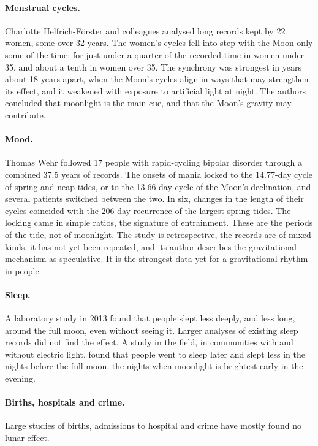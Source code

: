 \documentclass[11pt,a4paper]{article}
\begin{document}
\paragraph{Menstrual cycles.} Charlotte Helfrich-F\"orster and colleagues analysed long records kept by 22 women, some over 32 years. The women's cycles fell into step with the Moon only some of the time: for just under a quarter of the recorded time in women under 35, and about a tenth in women over 35. The synchrony was strongest in years about 18 years apart, when the Moon's cycles align in ways that may strengthen its effect, and it weakened with exposure to artificial light at night. The authors concluded that moonlight is the main cue, and that the Moon's gravity may contribute.

\paragraph{Mood.} Thomas Wehr followed 17 people with rapid-cycling bipolar disorder through a combined 37.5 years of records. The onsets of mania locked to the 14.77-day cycle of spring and neap tides, or to the 13.66-day cycle of the Moon's declination, and several patients switched between the two. In six, changes in the length of their cycles coincided with the 206-day recurrence of the largest spring tides. The locking came in simple ratios, the signature of entrainment. These are the periods of the tide, not of moonlight. The study is retrospective, the records are of mixed kinds, it has not yet been repeated, and its author describes the gravitational mechanism as speculative. It is the strongest data yet for a gravitational rhythm in people.

\paragraph{Sleep.} A laboratory study in 2013 found that people slept less deeply, and less long, around the full moon, even without seeing it. Larger analyses of existing sleep records did not find the effect. A study in the field, in communities with and without electric light, found that people went to sleep later and slept less in the nights before the full moon, the nights when moonlight is brightest early in the evening.

\paragraph{Births, hospitals and crime.} Large studies of births, admissions to hospital and crime have mostly found no lunar effect.
\end{document}
